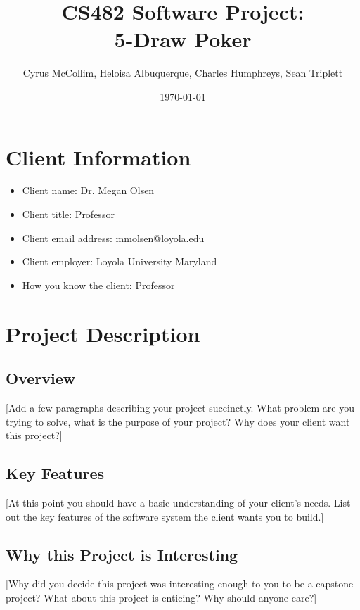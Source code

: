 \documentclass{article}
\title{CS482 Software Project: \\ 
5-Draw Poker}
\author{Cyrus McCollim, Heloisa Albuquerque, Charles Humphreys, Sean Triplett}
\date{\today}
\begin{document}
\maketitle %

\section{Client Information}
\begin{itemize}
    \item Client name: Dr. Megan Olsen
    \item Client title: Professor
    \item Client email address: mmolsen@loyola.edu
    \item Client employer: Loyola University Maryland
    \item How you know the client: Professor
\end{itemize}

\section{Project Description}

\subsection{Overview}
[Add a few paragraphs describing your project succinctly. What problem are you trying to solve, what is the purpose of your project? Why does your client want this project?]

\subsection{Key Features}
[At this point you should have a basic understanding of your client's needs. List out the key features of the software system the client wants you to build.]

\subsection{Why this Project is Interesting}
[Why did you decide this project was interesting enough to you to be a capstone project? What about this project is enticing? Why should anyone care?]
\end{document}
